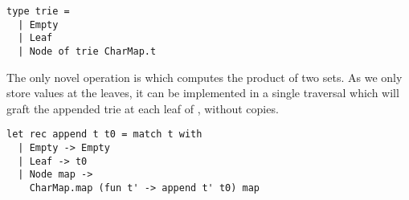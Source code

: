 \begin{lstlisting}
type trie =
  | Empty
  | Leaf
  | Node of trie CharMap.t
\end{lstlisting}

The only novel operation is  which computes the product of two sets.
As we only store values at the leaves,
it can be implemented in a single traversal which will graft the appended trie
 at each leaf of , without copies.

\begin{lstlisting}
let rec append t t0 = match t with
  | Empty -> Empty
  | Leaf -> t0
  | Node map -> 
    CharMap.map (fun t' -> append t' t0) map
\end{lstlisting}


